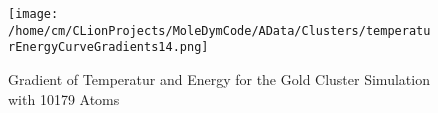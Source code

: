 \begin{figure}[!h] 
    \begin{center} 
        \texttt{[image: /home/cm/CLionProjects/MoleDymCode/AData/Clusters/temperaturEnergyCurveGradients14.png]} 
    \end{center} 
    \caption[Gradient of Temperatur and Energy for the Gold Cluster Simulation with 10179 Atoms]{Gradient of Temperatur and Energy for the Gold Cluster Simulation with 10179 Atoms} 
    \label{GoldClusterSimulationGradient10179} 
\end{figure} 
 
